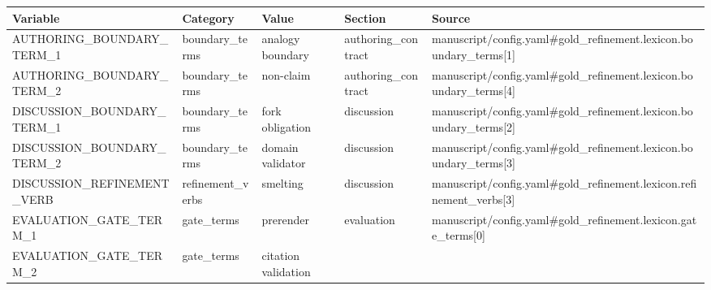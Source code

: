 \documentclass[
  english,
]{article}
\newcounter{none} %
\begin{document}
{\def\LTcaptype{none} %
\begin{longtable}[]{@{}
  >{\raggedright\arraybackslash}p{}
  >{\raggedright\arraybackslash}p{}
  >{\raggedright\arraybackslash}p{}
  >{\raggedright\arraybackslash}p{}
  >{\raggedright\arraybackslash}p{}@{}}
\toprule\noalign{}
\begin{minipage}[b]{\linewidth}\raggedright
Variable
\end{minipage} & \begin{minipage}[b]{\linewidth}\raggedright
Category
\end{minipage} & \begin{minipage}[b]{\linewidth}\raggedright
Value
\end{minipage} & \begin{minipage}[b]{\linewidth}\raggedright
Section
\end{minipage} & \begin{minipage}[b]{\linewidth}\raggedright
Source
\end{minipage} \\
\midrule\noalign{}
\endhead
\bottomrule\noalign{}
\endlastfoot
AUTHORING\_BOUNDARY\_TERM\_1 & boundary\_terms & analogy boundary &
authoring\_contract &
manuscript/config.yaml\#gold\_refinement.lexicon.boundary\_terms{[}1{]} \\
AUTHORING\_BOUNDARY\_TERM\_2 & boundary\_terms & non-claim &
authoring\_contract &
manuscript/config.yaml\#gold\_refinement.lexicon.boundary\_terms{[}4{]} \\
DISCUSSION\_BOUNDARY\_TERM\_1 & boundary\_terms & fork obligation &
discussion &
manuscript/config.yaml\#gold\_refinement.lexicon.boundary\_terms{[}2{]} \\
DISCUSSION\_BOUNDARY\_TERM\_2 & boundary\_terms & domain validator &
discussion &
manuscript/config.yaml\#gold\_refinement.lexicon.boundary\_terms{[}3{]} \\
DISCUSSION\_REFINEMENT\_VERB & refinement\_verbs & smelting & discussion
&
manuscript/config.yaml\#gold\_refinement.lexicon.refinement\_verbs{[}3{]} \\
EVALUATION\_GATE\_TERM\_1 & gate\_terms & prerender & evaluation &
manuscript/config.yaml\#gold\_refinement.lexicon.gate\_terms{[}0{]} \\
EVALUATION\_GATE\_TERM\_2 & gate\_terms & citation validation &

\end{longtable}}
\end{document}
